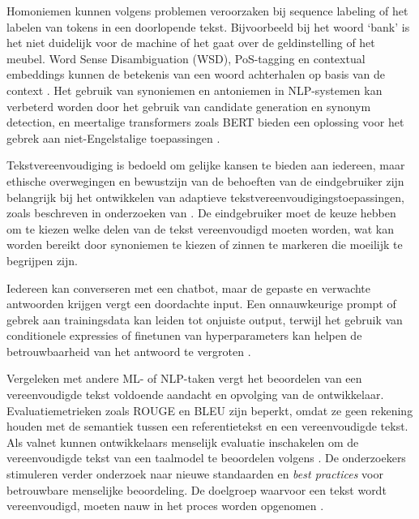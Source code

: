 Homoniemen kunnen volgens \textcite{Roldos2020} problemen veroorzaken bij sequence labeling of het labelen van tokens in een doorlopende tekst. Bijvoorbeeld bij het woord ‘bank’ is het niet duidelijk voor de machine of het gaat over de geldinstelling of het meubel. Word Sense Disambiguation (WSD), PoS-tagging en contextual embeddings kunnen de betekenis van een woord achterhalen op basis van de context \autocite{Eisenstein2019, Liu2020}. Het gebruik van synoniemen en antoniemen in NLP-systemen kan verbeterd worden door het gebruik van candidate generation en synonym detection, en meertalige transformers zoals BERT bieden een oplossing voor het gebrek aan niet-Engelstalige toepassingen \autocite{Dandekar2016, Roldos2020}.

\medspace

Tekstvereenvoudiging is bedoeld om gelijke kansen te bieden aan iedereen, maar ethische overwegingen en bewustzijn van de behoeften van de eindgebruiker zijn belangrijk bij het ontwikkelen van adaptieve tekstvereenvoudigingstoepassingen, zoals beschreven in onderzoeken van \textcite{Niemeijer2010, Xu2015, Gooding2022}. De eindgebruiker moet de keuze hebben om te kiezen welke delen van de tekst vereenvoudigd moeten worden, wat kan worden bereikt door synoniemen te kiezen of zinnen te markeren die moeilijk te begrijpen zijn.

\medspace

Iedereen kan converseren met een chatbot, maar de gepaste en verwachte antwoorden krijgen vergt een doordachte input. Een onnauwkeurige prompt of gebrek aan trainingsdata kan leiden tot onjuiste output, terwijl het gebruik van conditionele expressies of finetunen van hyperparameters kan helpen de betrouwbaarheid van het antwoord te vergroten \autocite{Miszczak2023, Jiang2023}.

\medspace

Vergeleken met andere ML- of NLP-taken vergt het beoordelen van een vereenvoudigde tekst voldoende aandacht en opvolging van de ontwikkelaar. Evaluatiemetrieken zoals ROUGE en BLEU zijn beperkt, omdat ze geen rekening houden met de semantiek tussen een referentietekst en een vereenvoudigde tekst. Als valnet kunnen ontwikkelaars menselijk evaluatie inschakelen om de vereenvoudigde tekst van een taalmodel te beoordelen volgens \textcite{Fabbri2020}. De onderzoekers stimuleren verder onderzoek naar nieuwe standaarden en \textit{best practices} voor betrouwbare menselijke beoordeling. De doelgroep waarvoor een tekst wordt vereenvoudigd, moeten nauw in het proces worden opgenomen \autocite{Iskender2021}.


